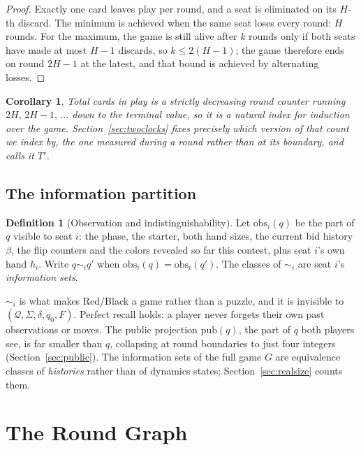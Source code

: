 \documentclass[11pt]{article}
\theoremstyle{plain}
\newtheorem{corollary}[theorem]{Corollary}
\theoremstyle{definition}
\newtheorem{definition}[theorem]{Definition}
\theoremstyle{remark}
\newcommand{\Q}{\ensuremath{\mathcal{Q}}}
\newcommand{\Sig}{\ensuremath{\Sigma}}
\newcommand{\dtrans}{\ensuremath{\delta}}
\begin{document}
\begin{proof}
Exactly one card leaves play per round, and a seat is eliminated on its
$H$-th discard. The minimum is achieved when the same seat loses every
round: $H$ rounds. For the maximum, the game is still alive after $k$
rounds only if both seats have made at most $H-1$ discards, so
$k\le 2(H-1)$; the game therefore ends on round $2H-1$ at the latest, and
that bound is achieved by alternating losses.
\end{proof}

\begin{corollary}\label{cor:counter}
Total cards in play is a strictly decreasing round counter running
$2H,\,2H-1,\,\dots$ down to the terminal value, so it is a natural index for
induction over the game. Section~\ref{sec:twoclocks} fixes precisely which
version of that count we index by, the one measured \emph{during} a round
rather than at its boundary, and calls it $T'$.
\end{corollary}

\subsection{The information partition}\label{sec:partition}

\begin{definition}[Observation and indistinguishability]
Let $\mathrm{obs}_i(q)$ be the part of $q$ visible to seat $i$: the phase,
the starter, both hand sizes, the current bid history $\beta$, the flip
counters and the colors revealed so far this contest, plus seat $i$'s own
hand $h_i$. Write $q\sim_i q'$ when $\mathrm{obs}_i(q)=\mathrm{obs}_i(q')$.
The classes of $\sim_i$ are seat $i$'s \emph{information sets}.
\end{definition}

$\sim_i$ is what makes Red/Black a game rather than a puzzle, and it is
invisible to $(\Q,\Sig,\dtrans,q_0,F)$. Perfect recall holds: a player
never forgets their own past observations or moves. The public projection
$\mathrm{pub}(q)$, the part of $q$ both players see, is far smaller than
$q$, collapsing at round boundaries to just four integers
(Section~\ref{sec:public}). The information sets of the full game $G$ are
equivalence classes of \emph{histories} rather than of dynamics states;
Section~\ref{sec:realsize} counts them.

\section{The Round Graph}\label{sec:round}
\end{document}
